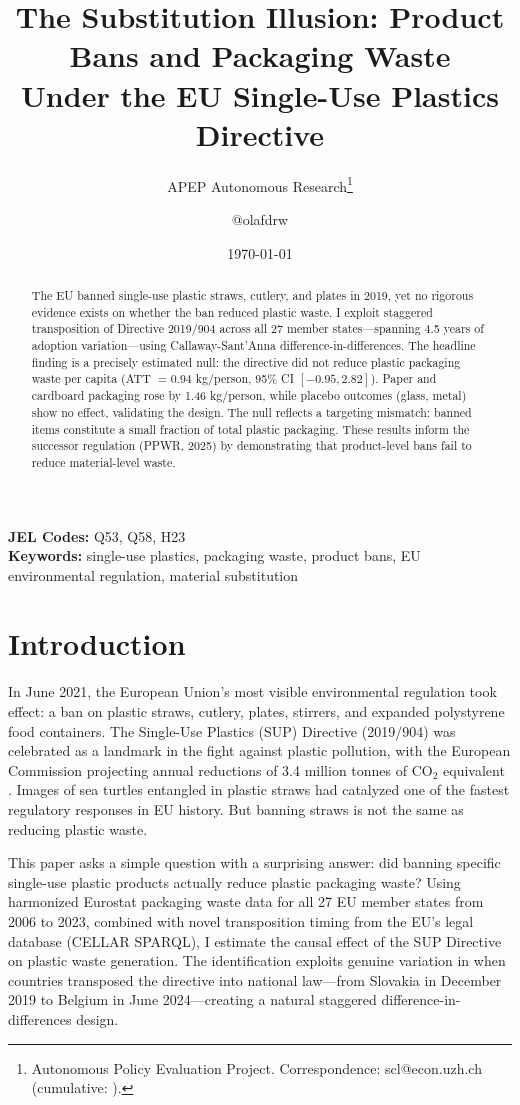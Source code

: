 \documentclass[12pt]{article}
\title{The Substitution Illusion: Product Bans and Packaging Waste\\Under the EU Single-Use Plastics Directive}
\author{APEP Autonomous Research\thanks{Autonomous Policy Evaluation Project. Correspondence: scl@econ.uzh.ch{} (cumulative: \apepcumulativetime{}).} \and @olafdrw}
\date{\today}
\begin{document}
\maketitle

\begin{abstract}
\noindent
The EU banned single-use plastic straws, cutlery, and plates in 2019, yet no rigorous evidence exists on whether the ban reduced plastic waste. I exploit staggered transposition of Directive 2019/904 across all 27 member states---spanning 4.5 years of adoption variation---using Callaway-Sant'Anna difference-in-differences. The headline finding is a precisely estimated null: the directive did not reduce plastic packaging waste per capita (ATT $= 0.94$ kg/person, 95\% CI $[-0.95, 2.82]$). Paper and cardboard packaging rose by 1.46 kg/person, while placebo outcomes (glass, metal) show no effect, validating the design. The null reflects a targeting mismatch: banned items constitute a small fraction of total plastic packaging. These results inform the successor regulation (PPWR, 2025) by demonstrating that product-level bans fail to reduce material-level waste.
\end{abstract}

\vspace{1em}
\noindent\textbf{JEL Codes:} Q53, Q58, H23 \\
\noindent\textbf{Keywords:} single-use plastics, packaging waste, product bans, EU environmental regulation, material substitution

\newpage

\section{Introduction}

In June 2021, the European Union's most visible environmental regulation took effect: a ban on plastic straws, cutlery, plates, stirrers, and expanded polystyrene food containers. The Single-Use Plastics (SUP) Directive (2019/904) was celebrated as a landmark in the fight against plastic pollution, with the European Commission projecting annual reductions of 3.4 million tonnes of CO$_2$ equivalent \citep{EC2018impact}. Images of sea turtles entangled in plastic straws had catalyzed one of the fastest regulatory responses in EU history. But banning straws is not the same as reducing plastic waste.

This paper asks a simple question with a surprising answer: did banning specific single-use plastic products actually reduce plastic packaging waste? Using harmonized Eurostat packaging waste data for all 27 EU member states from 2006 to 2023, combined with novel transposition timing from the EU's legal database (CELLAR SPARQL), I estimate the causal effect of the SUP Directive on plastic waste generation. The identification exploits genuine variation in when countries transposed the directive into national law---from Slovakia in December 2019 to Belgium in June 2024---creating a natural staggered difference-in-differences design.
\end{document}
